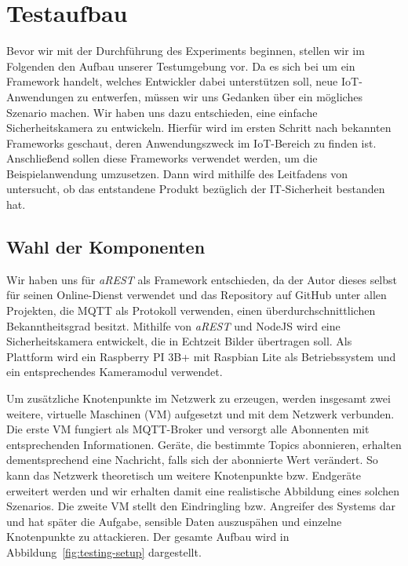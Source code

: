 \section{Testaufbau}
Bevor wir mit der Durchführung des Experiments beginnen, stellen wir im
Folgenden den Aufbau unserer Testumgebung vor. Da es sich bei \cite{paper} um
ein Framework handelt, welches Entwickler dabei unterstützen soll, neue
IoT-Anwendungen zu entwerfen, müssen wir uns Gedanken über ein mögliches
Szenario machen. Wir haben uns dazu entschieden, eine einfache Sicherheitskamera
zu entwickeln. Hierfür wird im ersten Schritt nach bekannten Frameworks
geschaut, deren Anwendungszweck im IoT-Bereich zu finden ist. Anschließend
sollen diese Frameworks verwendet werden, um die Beispielanwendung umzusetzen.
Dann wird mithilfe des Leitfadens von \cite{paper} untersucht, ob das
entstandene Produkt bezüglich der IT-Sicherheit bestanden hat.

\subsection{Wahl der Komponenten}

Wir haben uns für \textit{aREST} als Framework entschieden, da der Autor dieses
selbst für seinen Online-Dienst verwendet und das Repository auf GitHub unter
allen Projekten, die MQTT als Protokoll verwenden, einen über\-durch\-schnittlichen
Bekanntheitsgrad besitzt. Mithilfe von \textit{aREST} und NodeJS wird eine
Sicherheitskamera entwickelt, die in Echtzeit Bilder übertragen soll. Als
Plattform wird ein Raspberry PI 3B+ mit Raspbian Lite als Betriebssystem und ein
entsprechendes Kameramodul verwendet.

Um zusätzliche Knotenpunkte im Netzwerk zu erzeugen, werden insgesamt zwei
weitere, virtuelle Maschinen (VM) aufgesetzt und mit dem Netzwerk verbunden. Die
erste VM fungiert als MQTT-Broker und versorgt alle Abonnenten mit entsprechenden
Informationen. Geräte, die bestimmte Topics abonnieren, erhalten dementsprechend
eine Nachricht, falls sich der abonnierte Wert verändert. So kann das Netzwerk
theoretisch um weitere Knotenpunkte bzw. Endgeräte erweitert werden und wir
erhalten damit eine realistische Abbildung eines solchen Szenarios. Die zweite
VM stellt den Eindringling bzw. Angreifer des Systems dar und hat später die
Aufgabe, sensible Daten auszuspähen und einzelne Knotenpunkte zu attackieren.
Der gesamte Aufbau wird in Abbildung~\ref{fig:testing-setup} dargestellt.

